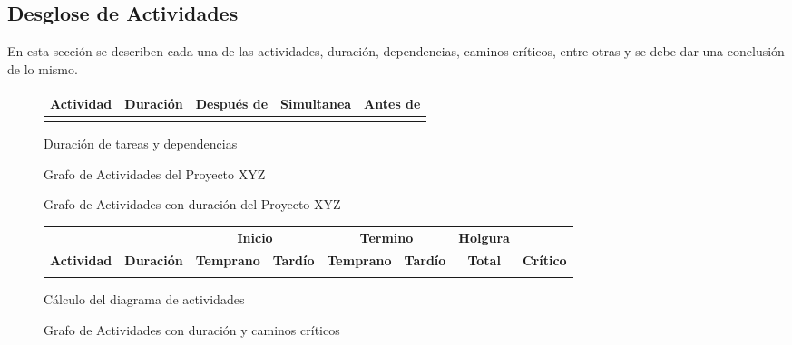 \documentclass[letter,12pt]{report}
\begin{document}
\subsection{Desglose de Actividades}\label{PERT}
En esta sección se describen cada una de las actividades, duración, dependencias, caminos críticos, entre otras y se debe dar una conclusión de lo mismo.
\begin{figure}[hbt]
\begin{tabular}{|c|c|c|c|c|}\hline
  \textbf{Actividad}&\textbf{Duración} &\textbf{Después de} & \textbf{Simultanea} & \textbf{Antes de}\\\hline
& & &&\\\hline

\end{tabular}
  \caption{Duración de tareas y dependencias}
\end{figure}

\begin{landscape}
\begin{figure}[hbt]
  \centering
  \caption{Grafo de Actividades del Proyecto XYZ}
  \label{CPM}
\end{figure}
\end{landscape}

\begin{landscape}
\begin{figure}[hbt]
  \centering
  \caption{Grafo de Actividades con duración del Proyecto XYZ}
  \label{CPMduracion}
\end{figure}
\end{landscape}

\begin{figure}[hbt]
 \begin{tabular}{|c|c|cc|cc|c|c|}\hline
 & & \multicolumn{2}{|c|}{\textbf{Inicio}} & \multicolumn{2}{|c|}{\textbf{Termino}} & \textbf{Holgura} & \\
\textbf{Actividad}& \textbf{Duración}& \textbf{Temprano} &\textbf{Tardío} &\textbf{Temprano} &\textbf{Tardío} &\textbf{Total}  &\textbf{Crítico} \\\hline
& & &   & &   & & \\\hline

\end{tabular}
  \caption{Cálculo del diagrama de actividades}
\end{figure}

\begin{landscape}
\begin{figure}[hbt]
  \centering
  \caption{Grafo de Actividades con duración y caminos críticos}
  \label{CPMcritico}
\end{figure}
\end{landscape}
\end{document}
